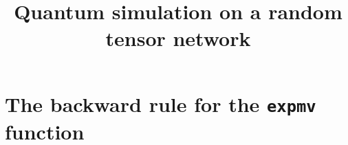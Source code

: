 \documentclass{article}
\title{Quantum simulation on a random tensor network}
\theoremstyle{definition}
\begin{document}
\maketitle

\section{The backward rule for the \texttt{expmv} function}



\end{document}
